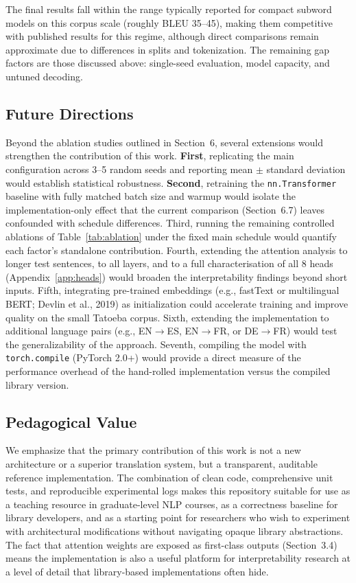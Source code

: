 \documentclass[10pt]{article}
\begin{document}
The final results fall within the range typically reported for compact subword models on this corpus scale (roughly BLEU 35--45), making them competitive with published results for this regime, although direct comparisons remain approximate due to differences in splits and tokenization. The remaining gap factors are those discussed above: single-seed evaluation, model capacity, and untuned decoding.

\subsection{Future Directions}

Beyond the ablation studies outlined in Section~6, several extensions would strengthen the contribution of this work. \textbf{First}, replicating the main configuration across 3--5 random seeds and reporting mean $\pm$ standard deviation would establish statistical robustness. \textbf{Second}, retraining the \texttt{nn.Transformer} baseline with fully matched batch size and warmup would isolate the implementation-only effect that the current comparison (Section~6.7) leaves confounded with schedule differences. Third, running the remaining controlled ablations of Table~\ref{tab:ablation} under the fixed main schedule would quantify each factor's standalone contribution. Fourth, extending the attention analysis to longer test sentences, to all layers, and to a full characterisation of all 8 heads (Appendix~\ref{app:heads}) would broaden the interpretability findings beyond short inputs. Fifth, integrating pre-trained embeddings (e.g., fastText or multilingual BERT; Devlin et al., 2019) as initialization could accelerate training and improve quality on the small Tatoeba corpus. Sixth, extending the implementation to additional language pairs (e.g., EN$\rightarrow$ES, EN$\rightarrow$FR, or DE$\rightarrow$FR) would test the generalizability of the approach. Seventh, compiling the model with \texttt{torch.compile} (PyTorch 2.0+) would provide a direct measure of the performance overhead of the hand-rolled implementation versus the compiled library version.

\subsection{Pedagogical Value}

We emphasize that the primary contribution of this work is not a new architecture or a superior translation system, but a transparent, auditable reference implementation. The combination of clean code, comprehensive unit tests, and reproducible experimental logs makes this repository suitable for use as a teaching resource in graduate-level NLP courses, as a correctness baseline for library developers, and as a starting point for researchers who wish to experiment with architectural modifications without navigating opaque library abstractions. The fact that attention weights are exposed as first-class outputs (Section~3.4) means the implementation is also a useful platform for interpretability research at a level of detail that library-based implementations often hide.
\end{document}
